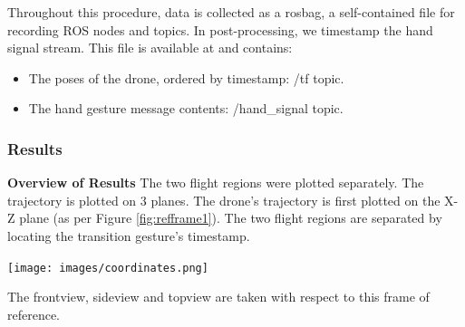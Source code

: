 Throughout this procedure, data is collected as a rosbag, a self-contained file for recording ROS nodes and topics. In post-processing, we timestamp the hand signal stream. This file is available at \cite{piloting_data} and contains:

\begin{itemize}
    \item The poses of the drone, ordered by timestamp: /tf topic.
    \item The hand gesture message contents: /hand\_signal topic.
\end{itemize}



\pagebreak
\subsubsection{Results}


\textbf{Overview of Results} \hspace{0.3cm} The two flight regions were plotted separately. The trajectory is plotted on 3 planes. The drone's trajectory is first plotted on the X-Z plane (as per Figure \ref{fig:refframe1}). The two flight regions are separated by locating the transition gesture's timestamp.

\begin{marginfigure}%
  \vspace*{0.6cm}
  \hspace{0.7cm}\texttt{[image: images/coordinates.png]}
  \caption{The frontview, sideview and topview are taken with respect to this frame of reference.}
  \label{fig:refframe1}
\end{marginfigure}


